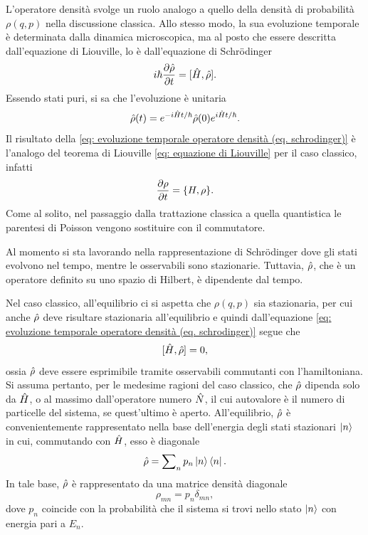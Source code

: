 L'operatore densità svolge un ruolo analogo a quello della densità di probabilità $\rho(q,p)$ nella discussione classica. Allo stesso modo, la sua evoluzione temporale è determinata dalla dinamica microscopica, ma al posto che essere descritta dall'equazione di Liouville, lo è dall'equazione di Schr\"odinger
\begin{equation}
\label{eq: evoluzione temporale operatore densità (eq. schrodinger)}
    i\hbar\frac{\partial \hat{\rho}}{\partial t} = [\hat{H},\hat{\rho}].
\end{equation}
Essendo stati puri, si sa che l'evoluzione è unitaria
\begin{equation}
    \hat{\rho}(t) = e^{-i\hat{H} t/\hbar}\hat{\rho}(0)e^{i\hat{H} t/\hbar}.
\end{equation}
Il risultato della \eqref{eq: evoluzione temporale operatore densità (eq. schrodinger)} è l'analogo del teorema di Liouville \eqref{eq: equazione di Liouville} per il caso classico, infatti
\begin{equation}
\label{eq: evoluzione temporale operatore densità (eq. liouville)}
    \frac{\partial \rho}{\partial t} = \{H,\rho\}.
\end{equation}
Come al solito, nel passaggio dalla trattazione classica a quella quantistica le parentesi di Poisson vengono sostituire con il commutatore. 
\begin{obs}
    Al momento si sta lavorando nella rappresentazione di Schr\"odinger dove gli stati evolvono nel tempo, mentre le osservabili sono stazionarie. Tuttavia, $\hat{\rho}$, che è un operatore definito su uno spazio di Hilbert, è dipendente dal tempo.
\end{obs}
Nel caso classico, all'equilibrio ci si aspetta che $\rho(q,p)$ sia stazionaria, per cui anche $\hat{\rho}$ deve risultare stazionaria all'equilibrio e quindi dall'equazione \eqref{eq: evoluzione temporale operatore densità (eq. schrodinger)} segue che
\begin{equation}
    [\hat{H},\hat{\rho}] = 0,
\end{equation}
ossia $\hat{\rho}$ deve essere esprimibile tramite osservabili commutanti con l'hamiltoniana. Si assuma pertanto, per le medesime ragioni del caso classico, che $\hat{\rho}$ dipenda solo da $\hat{H}$, o al massimo dall'operatore numero $\hat{N}$, il cui autovalore è il numero di particelle del sistema, se quest'ultimo è aperto. All'equilibrio, $\hat{\rho}$ è convenientemente rappresentato nella base dell'energia degli stati stazionari $\ket{n}$ in cui, commutando con $\hat{H}$, esso è diagonale
\begin{equation}
    \hat{\rho} = \sum\nolimits_n p_n\ket{n}\bra{n}.
\end{equation}
In tale base, $\hat{\rho}$ è rappresentato da una matrice densità diagonale
\begin{equation}
\label{eq: matrice densità diagonale}
    \rho_{mn} = p_n\delta_{mn},
\end{equation}
dove $p_n$ coincide con la probabilità che il sistema si trovi nello stato $\ket{n}$ con energia pari a $E_n$.

